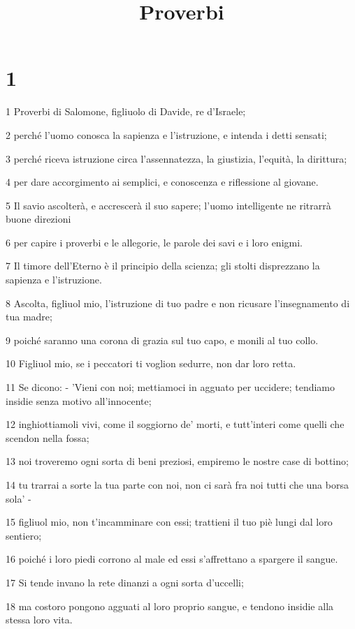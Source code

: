 

\title{Proverbi}


\chapter{1}

\par 1 Proverbi di Salomone, figliuolo di Davide, re d'Israele;
\par 2 perché l'uomo conosca la sapienza e l'istruzione, e intenda i detti sensati;
\par 3 perché riceva istruzione circa l'assennatezza, la giustizia, l'equità, la dirittura;
\par 4 per dare accorgimento ai semplici, e conoscenza e riflessione al giovane.
\par 5 Il savio ascolterà, e accrescerà il suo sapere; l'uomo intelligente ne ritrarrà buone direzioni
\par 6 per capire i proverbi e le allegorie, le parole dei savi e i loro enigmi.
\par 7 Il timore dell'Eterno è il principio della scienza; gli stolti disprezzano la sapienza e l'istruzione.
\par 8 Ascolta, figliuol mio, l'istruzione di tuo padre e non ricusare l'insegnamento di tua madre;
\par 9 poiché saranno una corona di grazia sul tuo capo, e monili al tuo collo.
\par 10 Figliuol mio, se i peccatori ti voglion sedurre, non dar loro retta.
\par 11 Se dicono: - 'Vieni con noi; mettiamoci in agguato per uccidere; tendiamo insidie senza motivo all'innocente;
\par 12 inghiottiamoli vivi, come il soggiorno de' morti, e tutt'interi come quelli che scendon nella fossa;
\par 13 noi troveremo ogni sorta di beni preziosi, empiremo le nostre case di bottino;
\par 14 tu trarrai a sorte la tua parte con noi, non ci sarà fra noi tutti che una borsa sola' -
\par 15 figliuol mio, non t'incamminare con essi; trattieni il tuo piè lungi dal loro sentiero;
\par 16 poiché i loro piedi corrono al male ed essi s'affrettano a spargere il sangue.
\par 17 Si tende invano la rete dinanzi a ogni sorta d'uccelli;
\par 18 ma costoro pongono agguati al loro proprio sangue, e tendono insidie alla stessa loro vita.
